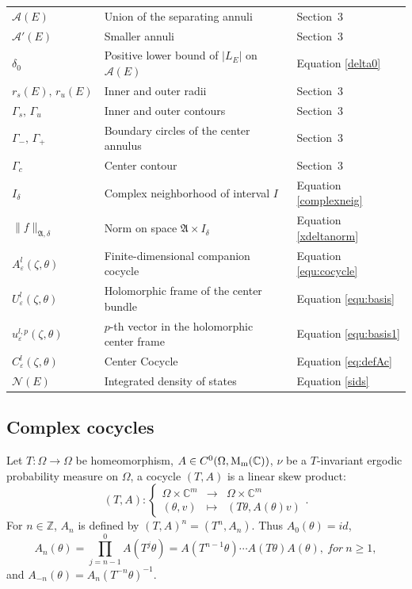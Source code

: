\documentclass[reqno,11pt]{amsart}
\newcommand{\C}{{\mathbb C}}
\begin{document}
\begin{longtable}{
    >{\raggedright\arraybackslash}p{}
    >{\raggedright\arraybackslash}p{}
    >{\raggedright\arraybackslash}p{}
}
$\mathcal A(E)$ & Union of the separating annuli & Section~3 \\
$\mathcal A'(E)$ & Smaller annuli & Section~3 \\
$\delta_0$ & Positive lower bound of $|L_{E}|$ on $\mathcal A(E)$ & Equation \eqref{delta0} \\
$r_s(E),\,r_u(E)$ & Inner and outer radii & Section~3 \\
$\Gamma_s,\,\Gamma_u$ & Inner and outer contours & Section~3 \\
$\Gamma_-,\,\Gamma_+$ & Boundary circles of the center annulus & Section~3 \\
$\Gamma_c$ & Center contour & Section~3 \\
$I_\delta$ & Complex neighborhood of interval $I$ & Equation \eqref{complexneig} \\
$\|f\|_{\mathfrak A,\delta}$ & Norm on space $\mathfrak A\times I_\delta$ & Equation \eqref{xdeltanorm} \\
$A^{l}_\varepsilon(\zeta,\theta)$ & Finite-dimensional companion cocycle  & Equation \eqref{equ:cocycle} \\
$U^{l}_\varepsilon(\zeta,\theta)$ & Holomorphic frame of the center bundle & Equation \eqref{equ:basis} \\
$u^{l,p}_\varepsilon(\zeta,\theta)$ & $p$-th vector in the holomorphic center frame & Equation \eqref{equ:basis1} \\
$C^{l}_\varepsilon(\zeta,\theta)$ &  Center Cocycle & Equation \eqref{eq:defAc} \\
$\mathcal N(E)$ & Integrated density of states & Equation \eqref{sids} \\

\end{longtable}

\subsection{Complex  cocycles}\label{com}
Let $T:\Omega\to \Omega$ be homeomorphism,  $A\in C^0(\Omega,{\rm M_m}(\C))$, $\nu$ be a $T$-invariant ergodic probability measure on $\Omega$, a cocycle $(T, A)$ is a linear skew product:
$$
(T,A)\colon \left\{
\begin{array}{rcl}
	\Omega\times \C^{m} &\to& \Omega \times \C^{m}\\
	(\theta,v) &\mapsto& (T\theta,A(\theta)v)
\end{array}
\right.  .
$$
For $n\in\mathbb{Z}$, $A_n$ is defined by $(T,A)^n=(T^n,A_n).$ Thus $A_{0}(\theta)=id$,
\begin{equation*}
	A_{n}(\theta)=\prod_{j=n-1}^{0}A(T^{j}\theta)=A(T^{n-1}\theta)\cdots A(T\theta)A(\theta),\ for\ n\ge1,
\end{equation*}
and $A_{-n}(\theta)=A_{n}(T^{-n}\theta)^{-1}$.
\end{document}
